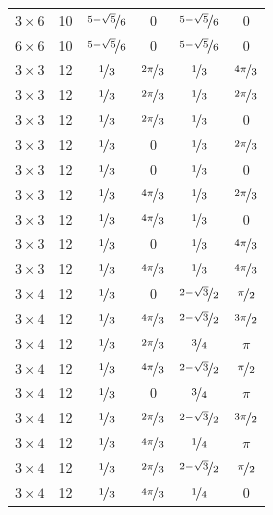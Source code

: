 \documentclass{article}
\begin{document}
\begin{longtable}{cccccc}
$3 \times 6$ & 10 & $\nicefrac{5-\sqrt{5}}{6}$ & 0 & $\nicefrac{5-\sqrt{5}}{6}$ & 0 \\
$6 \times 6$ & 10 & $\nicefrac{5-\sqrt{5}}{6}$ & 0 & $\nicefrac{5-\sqrt{5}}{6}$ & 0 \\
$3 \times 3$ & 12 & $\nicefrac{1}{3}$ & $\nicefrac{2\pi}{3}$ & $\nicefrac{1}{3}$ & $\nicefrac{4\pi}{3}$ \\
$3 \times 3$ & 12 & $\nicefrac{1}{3}$ & $\nicefrac{2\pi}{3}$ & $\nicefrac{1}{3}$ & $\nicefrac{2\pi}{3}$ \\
$3 \times 3$ & 12 & $\nicefrac{1}{3}$ & $\nicefrac{2\pi}{3}$ & $\nicefrac{1}{3}$ & 0 \\
$3 \times 3$ & 12 & $\nicefrac{1}{3}$ & 0 & $\nicefrac{1}{3}$ & $\nicefrac{2\pi}{3}$ \\
$3 \times 3$ & 12 & $\nicefrac{1}{3}$ & 0 & $\nicefrac{1}{3}$ & 0 \\
$3 \times 3$ & 12 & $\nicefrac{1}{3}$ & $\nicefrac{4\pi}{3}$ & $\nicefrac{1}{3}$ & $\nicefrac{2\pi}{3}$ \\
$3 \times 3$ & 12 & $\nicefrac{1}{3}$ & $\nicefrac{4\pi}{3}$ & $\nicefrac{1}{3}$ & 0 \\
$3 \times 3$ & 12 & $\nicefrac{1}{3}$ & 0 & $\nicefrac{1}{3}$ & $\nicefrac{4\pi}{3}$ \\
$3 \times 3$ & 12 & $\nicefrac{1}{3}$ & $\nicefrac{4\pi}{3}$ & $\nicefrac{1}{3}$ & $\nicefrac{4\pi}{3}$ \\
$3 \times 4$ & 12 & $\nicefrac{1}{3}$ & 0 & $\nicefrac{2-\sqrt{3}}{2}$ & $\nicefrac{\pi}{2}$ \\
$3 \times 4$ & 12 & $\nicefrac{1}{3}$ & $\nicefrac{4\pi}{3}$ & $\nicefrac{2-\sqrt{3}}{2}$ & $\nicefrac{3\pi}{2}$ \\
$3 \times 4$ & 12 & $\nicefrac{1}{3}$ & $\nicefrac{2\pi}{3}$ & $\nicefrac{3}{4}$ & $\pi$ \\
$3 \times 4$ & 12 & $\nicefrac{1}{3}$ & $\nicefrac{4\pi}{3}$ & $\nicefrac{2-\sqrt{3}}{2}$ & $\nicefrac{\pi}{2}$ \\
$3 \times 4$ & 12 & $\nicefrac{1}{3}$ & 0 & $\nicefrac{3}{4}$ & $\pi$ \\
$3 \times 4$ & 12 & $\nicefrac{1}{3}$ & $\nicefrac{2\pi}{3}$ & $\nicefrac{2-\sqrt{3}}{2}$ & $\nicefrac{3\pi}{2}$ \\
$3 \times 4$ & 12 & $\nicefrac{1}{3}$ & $\nicefrac{4\pi}{3}$ & $\nicefrac{1}{4}$ & $\pi$ \\
$3 \times 4$ & 12 & $\nicefrac{1}{3}$ & $\nicefrac{2\pi}{3}$ & $\nicefrac{2-\sqrt{3}}{2}$ & $\nicefrac{\pi}{2}$ \\
$3 \times 4$ & 12 & $\nicefrac{1}{3}$ & $\nicefrac{4\pi}{3}$ & $\nicefrac{1}{4}$ & 0 \\

\end{longtable}
\end{document}

